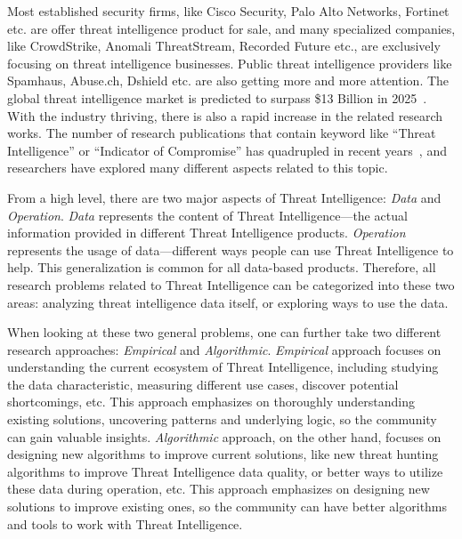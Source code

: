 \begin{dissertationintroduction}
Most established security firms, like Cisco Security, Palo Alto Networks,
Fortinet etc. are offer threat intelligence product for sale, and many 
specialized companies, like CrowdStrike, Anomali ThreatStream,
Recorded Future etc., are exclusively focusing on threat intelligence
businesses. Public threat intelligence providers like Spamhaus, Abuse.ch, 
Dshield etc. are also getting more and more attention. The global threat 
intelligence market is predicted to surpass \$13 Billion in 
2025~\cite{tipredict2018}. With the industry thriving, there is also 
a rapid increase in the related research works. The number of research 
publications that contain keyword like ``Threat Intelligence'' or 
``Indicator of Compromise'' has quadrupled in recent 
years~\cite{tounsi2018survey}, and researchers have explored many different
aspects related to this topic. 

From a high level, there are two major aspects of Threat Intelligence: 
\textit{Data} and \textit{Operation}. \textit{Data} represents the content 
of Threat Intelligence---the actual information provided in different Threat
Intelligence products. \textit{Operation} represents the usage of 
data---different ways people can use Threat Intelligence to help. This
generalization is common for all data-based products. Therefore,
all research problems related to Threat Intelligence can be categorized into
these two areas: analyzing threat intelligence data itself, or exploring
ways to use the data.

When looking at these two general problems, one can further 
take two different research approaches: \textit{Empirical} and 
\textit{Algorithmic}. \textit{Empirical} approach focuses on understanding
the current ecosystem of Threat Intelligence, including studying the 
data characteristic, measuring different use cases, discover potential 
shortcomings, etc. This approach emphasizes on thoroughly understanding
existing solutions, uncovering patterns and underlying logic, 
so the community can gain valuable insights.
\textit{Algorithmic} approach, on the other hand, 
focuses on designing new algorithms to 
improve current solutions, like new threat hunting algorithms to improve 
Threat Intelligence data quality, or better ways to utilize these data 
during operation, etc. This approach emphasizes on designing new solutions 
to improve existing ones, so the community can have better algorithms and
tools to work with Threat Intelligence.


\end{dissertationintroduction}
